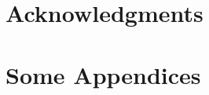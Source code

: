\documentclass{sig-alternate-05-2015}
\begin{document}
\section{Acknowledgments}

%

%
%
\appendix
\section{Some Appendices}
\end{document}
